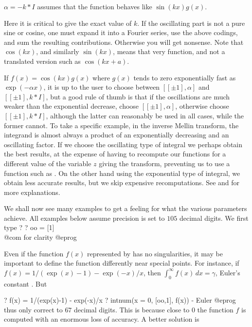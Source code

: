 \item $\alpha=-k* I$ assumes that the function behaves like $\sin(kx)g(x)$.

\noindent Here it is critical to give the exact value of $k$. If the
oscillating part is not a pure sine or cosine, one must expand it into a
Fourier series, use the above codings, and sum the resulting contributions.
Otherwise you will get nonsense. Note that $\cos(kx)$, and similarly
$\sin(kx)$, means that very function, and not a translated version such as
$\cos(kx+a)$.

 If $f(x)=\cos(kx)g(x)$ where $g(x)$ tends to zero
exponentially fast as $\exp(-\alpha x)$, it is up to the user to choose
between $[[\pm1],\alpha]$ and $[[\pm1],k* I]$, but a good rule of thumb is that
if the oscillations are much weaker than the exponential decrease, choose
$[[\pm1],\alpha]$, otherwise choose $[[\pm1],k* I]$, although the latter can
reasonably be used in all cases, while the former cannot. To take a specific
example, in the inverse Mellin transform, the integrand is almost always a
product of an exponentially decreasing and an oscillating factor. If we
choose the oscillating type of integral we perhaps obtain the best results,
at the expense of having to recompute our functions for a different value of
the variable $z$ giving the transform, preventing us to use a function such
as . On the other hand using the exponential type of
integral, we obtain less accurate results, but we skip expensive
recomputations. See  and  for more
explanations.

\smallskip

We shall now see many examples to get a feeling for what the various
parameters achieve. All examples below assume precision is set to $105$
decimal digits. We first type
\bprog
? 
? oo = [1]  \\@com for clarity
@eprog

 Even if the function $f(x)$ represented
by  has no singularities, it may be important to define the
function differently near special points. For instance, if $f(x) = 1
/(\exp(x)-1) - \exp(-x)/x$, then $\int_0^\infty f(x)\,dx=\gamma$, Euler's
constant . But

\bprog
? f(x) = 1/(exp(x)-1) - exp(-x)/x
? intnum(x = 0, [oo,1],  f(x)) - Euler
@eprog\noindent
thus only correct to $67$ decimal digits. This is because close to $0$ the
function $f$ is computed with an enormous loss of accuracy.
 A better solution is

